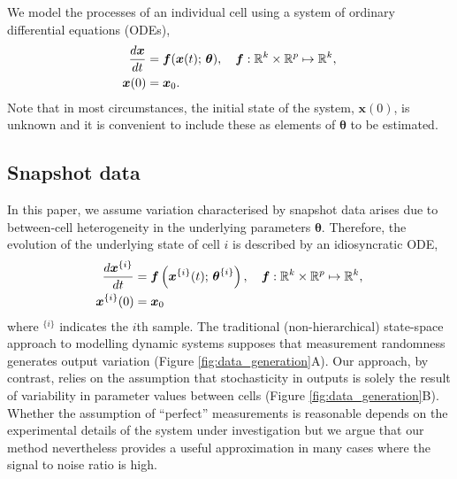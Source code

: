 We model the processes of an individual cell using a system of ordinary differential equations (ODEs), %
%
\begin{equation}\label{eq:ode}
\begin{aligned}
\frac{d\boldsymbol{x}}{dt} &= \boldsymbol{f}(\boldsymbol{x}(t); \, \boldsymbol{\theta}), \quad \boldsymbol{f}: \mathbb{R}^k \times \mathbb{R}^p \mapsto \mathbb{R}^k, \\
\boldsymbol{x}(0) &= \boldsymbol{x}_0.
\end{aligned}
\end{equation}
%
Note that in most circumstances, the initial state of the system, $\boldsymbol{x}(0)$, is unknown and it is convenient to include these as elements of $\boldsymbol{\theta}$ to be estimated. %


\subsection{Snapshot data}

In this paper, we assume variation characterised by snapshot data arises due to between-cell heterogeneity in the underlying parameters $\boldsymbol{\theta}$. Therefore, the evolution of the underlying state of cell $i$ is described by an idiosyncratic ODE,
%
\begin{equation} \label{eq:ode_i}
\begin{aligned}
\frac{d\boldsymbol{x}^{\{i\}}}{dt} &= \boldsymbol{f} \left( \boldsymbol{x}^{\{i\}}(t); \, \boldsymbol{\theta}^{\{i\}} \right),
                                      \quad \boldsymbol{f}: \mathbb{R}^k \times \mathbb{R}^p \mapsto \mathbb{R}^k, \\
\boldsymbol{x}^{\{i\}}(0) &= \boldsymbol{x}_0
\end{aligned}
\end{equation}
where $^{\{i\}}$ indicates the $i$th sample.
%
The traditional (non-hierarchical) state-space approach to modelling dynamic systems supposes that measurement randomness generates output variation (Figure \ref{fig:data_generation}A). Our approach, by contrast, relies on the assumption that stochasticity in outputs is solely the result of variability in parameter values between cells (Figure \ref{fig:data_generation}B). Whether the assumption of ``perfect'' measurements is reasonable depends on the experimental details of  the system under investigation but we argue that our method nevertheless provides a useful approximation in many cases where the signal to noise ratio is high.

